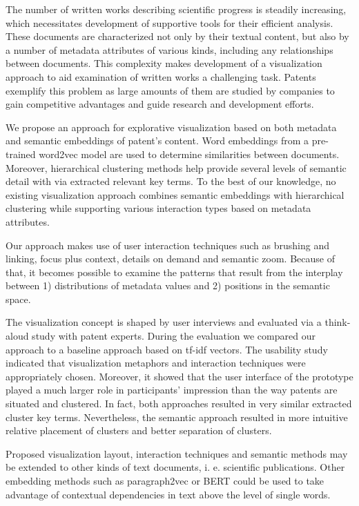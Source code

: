 
\Abstract
The number of written works describing scientific progress is steadily increasing, which necessitates development of supportive tools for their efficient analysis.
These documents are characterized not only by their textual content, but also by a number of metadata attributes of various kinds, including any relationships between documents.
This complexity makes development of a visualization approach to aid examination of written works a challenging task.
Patents exemplify this problem as large amounts of them are studied by companies to gain competitive advantages and guide research and development efforts.

We propose an approach for explorative visualization based on both metadata and semantic embeddings of patent’s content.
Word embeddings from a pre-trained word2vec model are used to determine similarities between documents. 
Moreover, hierarchical clustering methods help provide several levels of semantic detail with via extracted relevant key terms.
To the best of our knowledge, no existing visualization approach combines semantic embeddings with hierarchical clustering while supporting various interaction types based on metadata attributes.

Our approach makes use of user interaction techniques such as brushing and linking, focus plus context, details on demand and semantic zoom. 
Because of that, it becomes possible to examine the patterns that result from the interplay between 1) distributions of metadata values and 2) positions in the semantic space.

The visualization concept is shaped by user interviews and evaluated via a think-aloud study with patent experts. 
During the evaluation we compared our approach to a baseline approach based on \gls{tf-idf} vectors. 
The usability study indicated that visualization metaphors and interaction techniques were appropriately chosen.
Moreover, it showed that the user interface of the prototype played a much larger role in participants' impression than the way patents are situated and clustered.
In fact, both approaches resulted in very similar extracted cluster key terms.
Nevertheless, the semantic approach resulted in more intuitive relative placement of clusters and better separation of clusters.

Proposed visualization layout, interaction techniques and semantic methods may be extended to other kinds of text documents, i. e. scientific publications. 
Other embedding methods such as paragraph2vec \cite{Le2014} or BERT \cite{Devlin2018} could be used to take advantage of contextual dependencies in text above the level of single words.